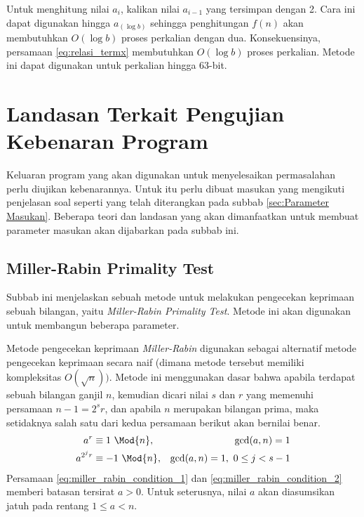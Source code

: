 Untuk menghitung nilai $ a_i $, kalikan nilai $ a_{i-1} $ yang tersimpan dengan 2. Cara ini dapat digunakan hingga $ a_{(\log b)} $ sehingga penghitungan $ f(n) $ akan membutuhkan $ O(\log b) $ proses perkalian dengan dua. Konsekuensinya, persamaan \eqref{eq:relasi_termx} membutuhkan $ O(\allowbreak\log b) $ proses perkalian. Metode ini dapat digunakan untuk perkalian hingga 63-bit.

\section{ Landasan Terkait Pengujian Kebenaran Program}
Keluaran program yang akan digunakan untuk menyelesaikan permasalahan perlu diujikan kebenarannya. Untuk itu perlu dibuat masukan yang mengikuti penjelasan soal seperti yang telah diterangkan pada subbab \ref{sec:Parameter Masukan}. Beberapa teori dan landasan yang akan dimanfaatkan untuk membuat parameter masukan akan dijabarkan pada subbab ini.

\subsection{ Miller-Rabin Primality Test}

Subbab ini menjelaskan sebuah metode untuk melakukan pengecekan keprimaan sebuah bilangan, yaitu \textit{Miller-Rabin Primality Test}. Metode ini akan digunakan untuk membangun beberapa parameter.

Metode pengecekan keprimaan \textit{Miller-Rabin} digunakan sebagai alternatif metode pengecekan keprimaan secara naif (dimana metode tersebut memiliki kompleksitas $ O(\sqrt{n})) $. Metode ini menggunakan dasar bahwa apabila terdapat sebuah bilangan ganjil $ n $, kemudian dicari nilai $ s $ dan $ r $ yang memenuhi persamaan $ n-1=2^{s} r $, dan apabila $ n $ merupakan bilangan prima, maka setidaknya salah satu dari kedua persamaan berikut akan bernilai benar. \cite{hac_publickey, stallings_cryptography}
\begin{align}
\label{eq:miller_rabin_condition_1}
a^r &\equiv 1\ \Mod{n}, & \gcd(a,n)=1 \\
\label{eq:miller_rabin_condition_2}
a^{2^j r} &\equiv -1\ \Mod{n}, & \gcd(a,n)=1,\ 0 \leq j <s-1
\end{align}
Persamaan \eqref{eq:miller_rabin_condition_1} dan \eqref{eq:miller_rabin_condition_2} memberi batasan tersirat $ a>0 $. Untuk seterusnya, nilai $ a $ akan diasumsikan jatuh pada rentang $ 1 \leq a < n $.

